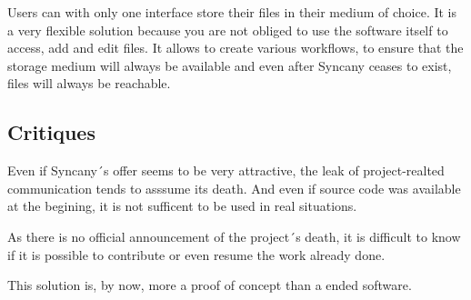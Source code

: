 Users can with only one interface store their files in their medium of choice. It is a very flexible solution because you are not obliged to use the software itself to access, add and edit files. It allows to create various workflows, to ensure that the storage medium will always be available and even after Syncany ceases to exist, files will always be reachable.

\subsection{Critiques}
Even if Syncany´s offer seems to be very attractive, the leak of project-realted communication tends to asssume its death. And even if source code was available at the begining, it is not sufficent to be used in real situations.

As there is no official announcement of the project´s death, it is difficult to know if it is possible to contribute or even resume the work already done.

This solution is, by now, more a proof of concept than a ended software.
